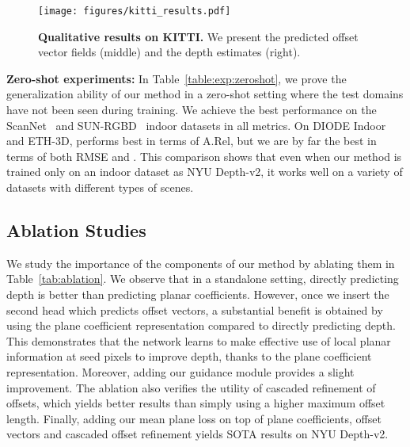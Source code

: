 \documentclass[final]{cvpr}
\begin{document}
\begin{figure}[t]
\texttt{[image: figures/kitti\_results.pdf]}
\caption{\textbf{Qualitative results on KITTI.} We present the predicted offset vector fields (middle) and the depth estimates (right). }
\label{fig:kitti_results}
\vspace{-0.6cm}
\end{figure}

\textbf{Zero-shot experiments:} In Table~\ref{table:exp:zeroshot}, we prove the generalization ability of our method in a zero-shot setting where the test domains have not been seen during training. We achieve the best performance on the ScanNet~\cite{scannet} and SUN-RGBD~\cite{sunrgbd} indoor datasets in all metrics. On DIODE Indoor and ETH-3D, \cite{virtual:normal:depth} performs best in terms of A.Rel, but we are by far the best in terms of both RMSE and . This comparison shows that even when our method is trained only on an indoor dataset as NYU Depth-v2, it works well on a variety of datasets with different types of scenes.

\subsection{Ablation Studies}

We study the importance of the components of our method by ablating them in Table~\ref{tab:ablation}. We observe that in a standalone setting, directly predicting depth is better than predicting planar coefficients. However, once we insert the second head which predicts offset vectors, a substantial benefit is obtained by using the plane coefficient representation compared to directly predicting depth. This demonstrates that the network learns to make effective use of local planar information at seed pixels to improve depth, thanks to the plane coefficient representation.
Moreover, adding our guidance module provides a slight improvement. The ablation also verifies the utility of cascaded refinement of offsets, which yields better results than simply using a higher maximum offset length. Finally, adding our mean plane loss on top of plane coefficients, offset vectors and cascaded offset refinement yields SOTA results on NYU Depth-v2.
\end{document}
